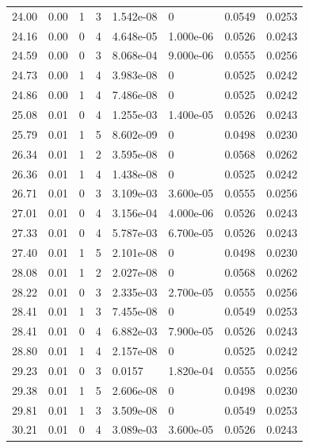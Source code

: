 \documentclass[preview]{standalone}
\begin{document}
{{{\begin{tabular}{L{1.2cm}C{1.2cm} C{0.3cm}C{0.5cm} C{1.4cm}C{1.4cm} C{1.4cm}C{1.4cm}}
  24.00  &  0.00  & 1     &  3 &  1.542e-08  & 0  & 0.0549 &  0.0253   \\ 
  24.16  &  0.00  & 0     &  4 &  4.648e-05  & 1.000e-06  & 0.0526 &  0.0243   \\ 
  24.59  &  0.00  & 0     &  3 &  8.068e-04  & 9.000e-06  & 0.0555 &  0.0256   \\ 
  24.73  &  0.00  & 1     &  4 &  3.983e-08  & 0  & 0.0525 &  0.0242   \\ 
  24.86  &  0.00  & 1     &  4 &  7.486e-08  & 0  & 0.0525 &  0.0242   \\ 
  25.08  &  0.01  & 0     &  4 &  1.255e-03  & 1.400e-05  & 0.0526 &  0.0243   \\ 
  25.79  &  0.01  & 1     &  5 &  8.602e-09  & 0  & 0.0498 &  0.0230   \\ 
  26.34  &  0.01  & 1     &  2 &  3.595e-08  & 0  & 0.0568 &  0.0262   \\ 
  26.36  &  0.01  & 1     &  4 &  1.438e-08  & 0  & 0.0525 &  0.0242   \\ 
  26.71  &  0.01  & 0     &  3 &  3.109e-03  & 3.600e-05  & 0.0555 &  0.0256   \\ 
  27.01  &  0.01  & 0     &  4 &  3.156e-04  & 4.000e-06  & 0.0526 &  0.0243   \\ 
  27.33  &  0.01  & 0     &  4 &  5.787e-03  & 6.700e-05  & 0.0526 &  0.0243   \\ 
  27.40  &  0.01  & 1     &  5 &  2.101e-08  & 0  & 0.0498 &  0.0230   \\ 
  28.08  &  0.01  & 1     &  2 &  2.027e-08  & 0  & 0.0568 &  0.0262   \\ 
  28.22  &  0.01  & 0     &  3 &  2.335e-03  & 2.700e-05  & 0.0555 &  0.0256   \\ 
  28.41  &  0.01  & 1     &  3 &  7.455e-08  & 0  & 0.0549 &  0.0253   \\ 
  28.41  &  0.01  & 0     &  4 &  6.882e-03  & 7.900e-05  & 0.0526 &  0.0243   \\ 
  28.80  &  0.01  & 1     &  4 &  2.157e-08  & 0  & 0.0525 &  0.0242   \\ 
  29.23  &  0.01  & 0     &  3 &  0.0157  & 1.820e-04  & 0.0555 &  0.0256   \\ 
  29.38  &  0.01  & 1     &  5 &  2.606e-08  & 0  & 0.0498 &  0.0230   \\ 
  29.81  &  0.01  & 1     &  3 &  3.509e-08  & 0  & 0.0549 &  0.0253   \\ 
  30.21  &  0.01  & 0     &  4 &  3.089e-03  & 3.600e-05  & 0.0526 &  0.0243   \\ 

\end{tabular}}}}
\end{document}
